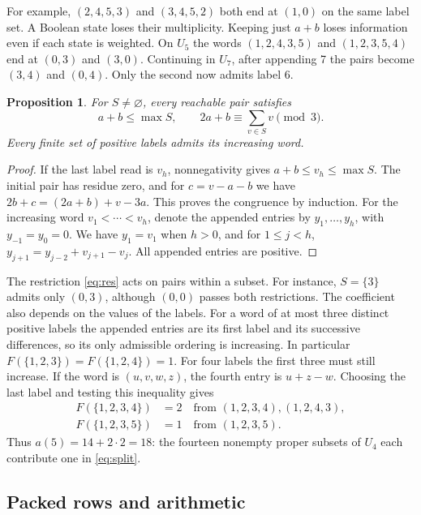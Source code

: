 \documentclass[11pt]{article}
\newtheorem{proposition}[theorem]{Proposition}
\begin{document}
For example, \((2,4,5,3)\) and \((3,4,5,2)\) both end at \((1,0)\) on
the same label set. A Boolean state loses their multiplicity.
Keeping just \(a+b\) loses information even if each state is weighted.
On \(U_5\) the words \((1,2,4,3,5)\) and \((1,2,3,5,4)\) end at
\((0,3)\) and \((3,0)\). Continuing in \(U_7\), after appending 7 the pairs become \((3,4)\)
and \((0,4)\). Only the second now admits label 6.

\begin{proposition}\label{prop:slice}
For \(S\ne\varnothing\), every reachable pair satisfies
\begin{equation}
 a+b\le\max S,\qquad 2a+b\equiv\sum_{v\in S}v\pmod3.
 \label{eq:res}
\end{equation}
Every finite set of positive labels admits its increasing word.
\end{proposition}
\begin{proof}
If the last label read is \(v_h\), nonnegativity gives \(a+b\le v_h\le\max S\). The initial
pair has residue zero, and for \(c=v-a-b\) we have
\(2b+c=(2a+b)+v-3a\). This proves the congruence by induction.
For the increasing word \(v_1<\cdots<v_h\), denote the appended entries
by \(y_1,\ldots,y_h\), with \(y_{-1}=y_0=0\). We have \(y_1=v_1\)
when \(h>0\), and for \(1\le j<h\),
\(y_{j+1}=y_{j-2}+v_{j+1}-v_j\). All appended entries are positive.
\end{proof}

The restriction \eqref{eq:res} acts on pairs within a subset. For instance,
\(S=\{3\}\) admits only \((0,3)\), although \((0,0)\) passes both
restrictions. The coefficient also depends on the values of the labels.
For a word of at most three distinct positive labels the appended entries
are its first label and its successive differences, so its only admissible
ordering is increasing. In particular \(F(\{1,2,3\})=F(\{1,2,4\})=1\).
For four labels the first three must still increase. If the word is
\((u,v,w,z)\), the fourth entry is \(u+z-w\). Choosing the last label
and testing this inequality gives
\[
 \begin{split}
 F(\{1,2,3,4\})&=2 \quad\text{from }(1,2,3,4),(1,2,4,3),\\
 F(\{1,2,3,5\})&=1 \quad\text{from }(1,2,3,5).
 \end{split}
\]
Thus \(a(5)=14+2\cdot2=18\): the fourteen nonempty proper subsets
of \(U_4\) each contribute one in \eqref{eq:split}.

\subsection{Packed rows and arithmetic}\label{sec:impl}
\end{document}
